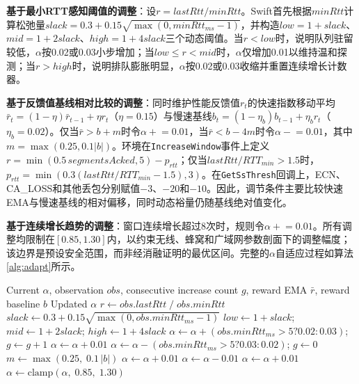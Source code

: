 \documentclass[10pt,twocolumn]{article}
\begin{document}
\textbf{基于最小RTT感知阈值的调整}：设$r = lastRtt/minRtt$。Swift首先根据$minRtt$计算松弛量$slack = 0.3 + 0.15\sqrt{\max(0,minRtt_{ms}-1)}$，并构造$low=1+slack$、$mid=1+2slack$、$high=1+4slack$三个动态阈值。当$r < low$时，说明队列驻留较低，$\alpha$按0.02或0.03小步增加；当$low \leq r < mid$时，$\alpha$仅增加0.01以维持温和探测；当$r > high$时，说明排队膨胀明显，$\alpha$按0.02或0.03收缩并重置连续增长计数器。

\textbf{基于反馈值基线相对比较的调整}：同时维护性能反馈值$r_t$的快速指数移动平均$\bar{r}_t = (1 - \eta) \bar{r}_{t-1} + \eta r_t$（$\eta=0.15$）与慢速基线$b_t = (1 - \eta_b)b_{t-1} + \eta_b r_t$（$\eta_b=0.02$）。仅当$\bar{r} > b + m$时令$\alpha \mathrel{+}=0.01$，当$\bar{r} < b - 4m$时令$\alpha \mathrel{-}=0.01$，其中$m = \max(0.25, 0.1|b|)$。环境在\texttt{IncreaseWindow}事件上定义$r = \min(0.5\,segmentsAcked, 5) - p_{rtt}$；仅当$lastRtt/RTT_{min}>1.5$时，$p_{rtt}=\min(0.3(lastRtt/RTT_{min}-1.5), 3)$。在\texttt{GetSsThresh}回调上，ECN、CA\_LOSS和其他丢包分别赋值$-3$、$-20$和$-10$。因此，调节条件主要比较快速EMA与慢速基线的相对偏移，同时动态裕量仍随基线绝对值变化。

\textbf{基于连续增长趋势的调整}：窗口连续增长超过8次时，规则令$\alpha \mathrel{+}=0.01$。所有调整均限制在$[0.85,1.30]$内，以约束无线、蜂窝和广域网参数剖面下的调整幅度；该边界是预设安全范围，而非经消融证明的最优区间。完整的$\alpha$自适应过程如算法\ref{alg:adapt}所示。

\begin{algorithm}[htbp]
\caption{RTT- and Reward-Aware Adaptive Parameter Tuning}
\label{alg:adapt}
\small
\begin{algorithmic}[1]
\REQUIRE Current $\alpha$, observation $obs$, consecutive increase count $g$, reward EMA $\bar{r}$, reward baseline $b$
\ENSURE Updated $\alpha$
\STATE $r \leftarrow obs.lastRtt \;/\; obs.minRtt$
\STATE $slack \leftarrow 0.3 + 0.15\sqrt{\max(0, obs.minRtt_{ms}-1)}$
\STATE $low \leftarrow 1+slack$; $mid \leftarrow 1+2slack$; $high \leftarrow 1+4slack$
    \STATE $\alpha \leftarrow \alpha + (obs.minRtt_{ms}>5 ? 0.02 : 0.03)$; $g \leftarrow g+1$
    \STATE $\alpha \leftarrow \alpha + 0.01$
    \STATE $\alpha \leftarrow \alpha - (obs.minRtt_{ms}>5 ? 0.03 : 0.02)$; $g \leftarrow 0$
\ENDIF
\STATE $m \leftarrow \max(0.25, \; 0.1\,|b|)$
    \STATE $\alpha \leftarrow \alpha + 0.01$
    \STATE $\alpha \leftarrow \alpha - 0.01$
\ENDIF
{}
    \STATE $\alpha \leftarrow \alpha + 0.01$
\ENDIF
\STATE $\alpha \leftarrow \text{clamp}(\alpha, \; 0.85, \; 1.30)$
\end{algorithmic}
\end{algorithm}
\end{document}
